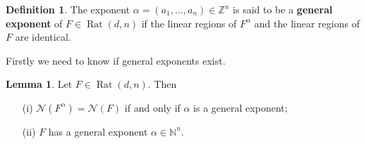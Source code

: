 \documentclass{article}
\theoremstyle{definition}
\newtheorem{lemma}[theorem]{Lemma}
\newtheorem{definition}[theorem]{Definition}
\DeclareMathOperator{\Rat}{Rat}
\begin{document}
\begin{definition}\hspace{1sp}\cite{zhang2018tropical}\label{def:gen_exp}
The exponent $\alpha = (a_1, \dots, a_n) \in \mathbb{Z}^{n}$ is said to be a \textbf{general exponent} of $F \in \Rat(d, n)$ if the linear regions of $F^{\alpha}$ and the linear regions of $F$ are identical.
\end{definition}
Firstly we need to know if general exponents exist.
\begin{lemma}\hspace{1sp}\cite{zhang2018tropical}
Let $F \in \Rat(d, n)$. Then
\begin{itemize}
\item[(i)]
$\mathcal{N}(F^{\alpha}) = \mathcal{N}(F)$ if and only if $\alpha$ is a general exponent;
\item[(ii)]
$F$ has a general exponent $\alpha \in \mathbb{N}^{n}$.
\end{itemize}
\end{lemma}
\end{document}
